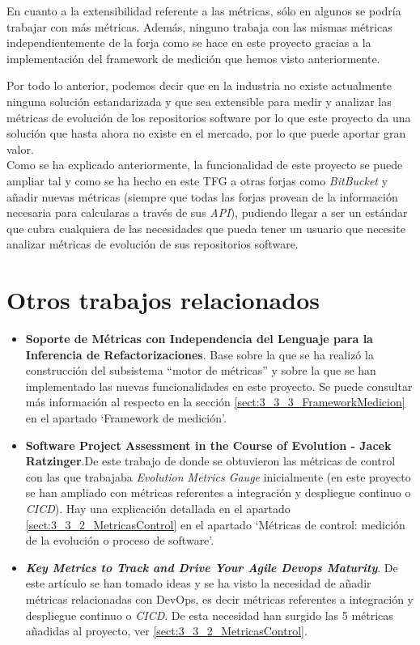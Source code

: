 En cuanto a la extensibilidad referente a las métricas, sólo en algunos se podría trabajar con más métricas. Además, ninguno trabaja con las mismas métricas independientemente de la forja como se hace en este proyecto gracias a la implementación del framework de medición que hemos visto anteriormente.

Por todo lo anterior, podemos decir que en la industria no existe actualmente ninguna solución estandarizada y que sea extensible para medir y analizar las métricas de evolución de los repositorios software por lo que este proyecto da una solución que hasta ahora no existe en el mercado, por lo que puede aportar gran valor.\\

Como se ha explicado anteriormente, la funcionalidad de este proyecto se puede ampliar tal y como se ha hecho en este TFG a otras forjas como \textit{BitBucket} y añadir nuevas métricas (siempre que todas las forjas provean de la información necesaria para calcularas a través de sus \textit{API}), pudiendo llegar a ser un estándar que cubra cualquiera de las necesidades que pueda tener un usuario que necesite analizar métricas de evolución de sus repositorios software.

\newpage
\section{Otros trabajos relacionados}
\begin{itemize}
	\item \textbf{Soporte de Métricas con Independencia del Lenguaje para la Inferencia de Refactorizaciones}. Base sobre la que se ha realizó la construcción del subsistema ``motor de métricas'' y sobre la que se han implementado las nuevas funcionalidades en este proyecto. Se puede consultar más información al respecto en la sección \ref{sect:3_3_3_FrameworkMedicion} en el apartado `Framework de medición'.
	
	\item \textbf{Software Project Assessment in the Course of Evolution -  Jacek Ratzinger}.De este trabajo de donde se obtuvieron las métricas de control con las que trabajaba \textit{Evolution Metrics Gauge} inicialmente (en este proyecto se han ampliado con métricas referentes a integración y despliegue continuo o \textit{CICD}). Hay una explicación detallada en el apartado \ref{sect:3_3_2_MetricasControl} en el apartado `Métricas de control: medición de la evolución o proceso de software'.

	\item \textbf{\textit{Key Metrics to Track and Drive Your Agile Devops Maturity}}\cite{KeyDevOpsMetrics}. De este artículo se han tomado ideas y se ha visto la necesidad de añadir métricas relacionadas con DevOps, es decir métricas referentes a integración y despliegue continuo o \textit{CICD}. De esta necesidad han surgido las 5 métricas añadidas al proyecto, ver \ref{sect:3_3_2_MetricasControl}.
\end{itemize}